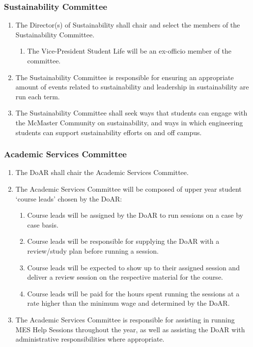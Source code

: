 \subsubsection{Sustainability Committee}
\label{sustainability-committee}
\begin{enumerate}
 \item
  The Director(s) of Sustainability shall chair and select the members of the Sustainability Committee.
  \begin{enumerate}
   \item The Vice-President Student Life will be an ex-officio member of the committee.
  \end{enumerate}
 \item
  The Sustainability Committee is responsible for ensuring an appropriate amount of events related to sustainability and leadership in sustainability are run each term.
 \item
  The Sustainability Committee shall seek ways that students can engage with the McMaster Community on sustainability, and ways in which engineering students can support sustainability efforts on and off campus.
\end{enumerate}

\subsubsection{Academic Services Committee}
\label{academic-services-committee}
\begin{enumerate}
 \item
  The DoAR shall chair the Academic Services Committee.
 \item
  The Academic Services Committee will be composed of upper year student `course leads' chosen by the DoAR:

  \begin{enumerate}
   \item
    Course leads will be assigned by the DoAR to run sessions on a case by case basis.
   \item
    Course leads will be responsible for supplying the DoAR with a review/study plan before running a session.
   \item
    Course leads will be expected to show up to their assigned session and deliver a review session on the respective material for the course.
   \item
    Course leads will be paid for the hours spent running the sessions at a rate higher than the minimum wage and determined by the DoAR.
  \end{enumerate}
 \item
  The Academic Services Committee is responsible for assisting in running MES Help Sessions throughout the year, as well as assisting the DoAR with administrative responsibilities where appropriate.

\end{enumerate}

